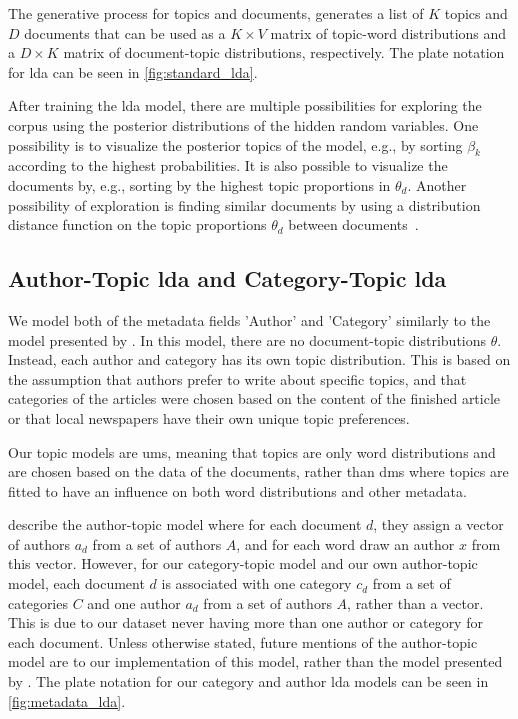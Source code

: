 The generative process for topics and documents, generates a list of $K$ topics and $D$ documents that can be used as a $K \times V$ matrix of topic-word distributions and a $D \times K$ matrix of document-topic distributions, respectively.
The plate notation for \gls{lda} can be seen in \autoref{fig:standard_lda}.



After training the \gls{lda} model, there are multiple possibilities for exploring the corpus using the posterior distributions of the hidden random variables.
One possibility is to visualize the posterior topics of the model, e.g., by sorting $\beta_k$ according to the highest probabilities.
It is also possible to visualize the documents by, e.g., sorting by the highest topic proportions in $\theta_d$.
Another possibility of exploration is finding similar documents by using a distribution distance function on the topic proportions $\theta_d$ between documents~\cite{blei2009topic}.

\subsection{Author-Topic \gls{lda} and Category-Topic \gls{lda}}
We model both of the metadata fields 'Author' and 'Category' similarly to the model presented by \citet{author_topic_2012}.
In this model, there are no document-topic distributions $\theta$.
Instead, each author and category has its own topic distribution.
This is based on the assumption that authors prefer to write about specific topics, and that categories of the articles were chosen based on the content of the finished article or that local newspapers have their own unique topic preferences.

Our topic models are \glspl{um}, meaning that topics are only word distributions and are chosen based on the data of the documents, rather than \glspl{dm} where topics are fitted to have an influence on both word distributions and other metadata.

\citet{author_topic_2012} describe the author-topic model where for each document $d$, they assign a vector of authors $a_d$ from a set of authors $A$, and for each word draw an author $x$ from this vector.
However, for our category-topic model and our own author-topic model, each document $d$ is associated with one category $c_d$ from a set of categories $C$ and one author $a_d$ from a set of authors $A$, rather than a vector.
This is due to our dataset never having more than one author or category for each document.
Unless otherwise stated, future mentions of the author-topic model are to our implementation of this model, rather than the model presented by \citet{author_topic_2012}.
The plate notation for our category and author \gls{lda} models can be seen in \autoref{fig:metadata_lda}.

